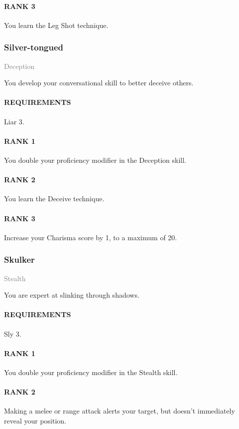 \paragraph{RANK 3} You learn the Leg Shot technique.

\subsubsection{Silver-tongued} \label{feat::silvertongued}
\small{\textcolor{gray}{Deception}}

\normalsize
You develop your conversational skill to better deceive others.
\paragraph{REQUIREMENTS} Liar 3.
\paragraph{RANK 1} You double your proficiency modifier in the Deception skill.
\paragraph{RANK 2} You learn the Deceive technique.
\paragraph{RANK 3} Increase your Charisma score by 1, to a maximum of 20.

\subsubsection{Skulker} \label{feat::skulker}
\small{\textcolor{gray}{Stealth}}

\normalsize
You are expert at slinking through shadows.
\paragraph{REQUIREMENTS} Sly 3.
\paragraph{RANK 1} You double your proficiency modifier in the Stealth skill.
\paragraph{RANK 2} Making a melee or range attack alerts your target, but doesn't immediately reveal your position.
